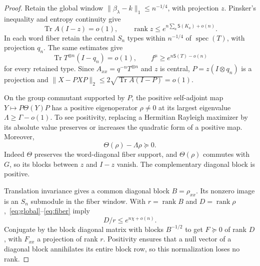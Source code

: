 \documentclass[12pt,letterpaper,onecolumn]{article}
\DeclareMathOperator{\Tr}{Tr}
\DeclareMathOperator{\rank}{rank}
\DeclareMathOperator{\spec}{spec}
\newcommand{\Ent}{\mathsf S}
\begin{document}
\begin{proof}
Retain the global window $\|\beta_\lambda-k\|_1\le n^{-1/4}$, with projection $z$. Pinsker's inequality and entropy continuity give
\begin{equation}\label{eq:global}
\Tr A(I-z)=o(1),\qquad
\rank z\le e^{n\sum_a\Ent(K_a)+o(n)}.
\end{equation}
In each word fiber retain the central $S_n$ types within $n^{-1/4}$ of $\spec(T)$, with projection $q_n$. The same estimates give
\begin{equation}\label{eq:fiber}
\Tr T^{\otimes n}(I-q_n)=o(1),\qquad
f^\mu\ge e^{n\Ent(T)-o(n)}
\end{equation}
for every retained type. Since $A_{xx}=q^{-n}T^{\otimes n}$ and $z$ is central, $P=z(I\otimes q_n)$ is a projection and
$\|X-PXP\|_2\le2\sqrt{\Tr A(I-P)}=o(1)$.

On the group commutant supported by $P$, the positive self-adjoint map $Y\mapsto P\Theta(Y)P$ has a positive eigenoperator $\rho\ne0$ at its largest eigenvalue $\Lambda\ge\Gamma-o(1)$. To see positivity, replacing a Hermitian Rayleigh maximizer by its absolute value preserves or increases the quadratic form of a positive map. Moreover,
\begin{equation}\label{eq:fullpositive}
\Theta(\rho)-\Lambda\rho\succeq0.
\end{equation}
Indeed $\Theta$ preserves the word-diagonal fiber support, and $\Theta(\rho)$ commutes with $G$, so its blocks between $z$ and $I-z$ vanish. The complementary diagonal block is positive.

Translation invariance gives a common diagonal block $B=\rho_{xx}$. Its nonzero image is an $S_n$ submodule in the fiber window. With $r=\rank B$ and $D=\rank\rho$,~\eqref{eq:global}--\eqref{eq:fiber} imply
\begin{equation}\label{eq:rankratio}
D/r\le e^{n\chi+o(n)}.
\end{equation}
Conjugate by the block diagonal matrix with blocks $B^{-1/2}$ to get $F\succeq0$ of rank $D$, with $F_{xx}$ a projection of rank $r$. Positivity ensures that a null vector of a diagonal block annihilates its entire block row, so this normalization loses no rank.


\end{proof}
\end{document}
